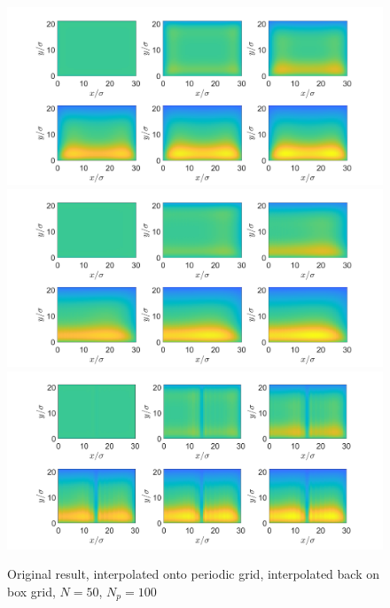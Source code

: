 \documentclass[11pt, a4paper]{article}
\theoremstyle{definition}
\begin{document}
	\begin{figure}[h]
		\centering
		\includegraphics[scale=0.3]{Original.png}
		\includegraphics[scale=0.3]{Periodic.png}
		\includegraphics[scale=0.3]{Interpolated.png}
		\caption{Original result, interpolated onto periodic grid, interpolated back on box grid, $N = 50$, $N_p = 100$} 
		\label{F3}
	\end{figure}
		
		
\end{document}
